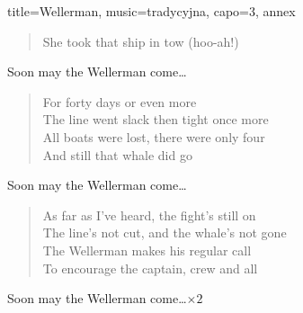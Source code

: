 \begin{song}{title={Wellerman}, music={tradycyjna}, capo=3, annex}
\begin{multicols}{2}
\begin{verse}
        She took that ship in tow (hoo-ah!)
    \end{verse}
    \begin{chorus}
        Soon may the Wellerman come\ldots
    \end{chorus}
    \begin{verse}
        For forty days or even more \\
        The line went slack then tight once more \\
        All boats were lost, there were only four \\
        And still that whale did go
    \end{verse}
    \begin{chorus}
        Soon may the Wellerman come\ldots
    \end{chorus}
    \begin{verse}
        As far as I've heard, the fight's still on \\
        The line's not cut, and the whale's not gone \\
        The Wellerman makes his regular call \\
        To encourage the captain, crew and all
    \end{verse}
    \begin{chorus}
        Soon may the Wellerman come\ldots $\times 2$
    \end{chorus}
\end{multicols}
\end{song}

